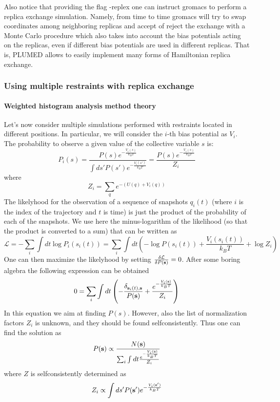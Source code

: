 Also notice that providing the flag {\ttfamily -\/replex} one can instruct gromacs to perform a replica exchange simulation. Namely, from time to time gromacs will try to swap coordinates among neighboring replicas and accept of reject the exchange with a Monte Carlo procedure which also takes into account the bias potentials acting on the replicas, even if different bias potentials are used in different replicas. That is, P\+L\+U\+M\+E\+D allows to easily implement many forms of Hamiltonian replica exchange.\hypertarget{munster_munster-multi-wham}{}\subsubsection{Using multiple restraints with replica exchange}\label{munster_munster-multi-wham}
 \hypertarget{munster_munster-wham-theory}{}\paragraph{Weighted histogram analysis method theory}\label{munster_munster-wham-theory}
Let's now consider multiple simulations performed with restraints located in different positions. In particular, we will consider the $i$-\/th bias potential as $V_i$. The probability to observe a given value of the collective variable $s$ is\+: \[ P_i({s})=\frac{P({s})e^{-\frac{V_i({s})}{k_BT}}}{\int ds' P({s}') e^{-\frac{V_i({s}')}{k_BT}}}= \frac{P({s})e^{-\frac{V_i({s})}{k_BT}}}{Z_i} \] where \[ Z_i=\sum_{q}e^{-\left(U(q)+V_i(q)\right)} \] The likelyhood for the observation of a sequence of snapshots $q_i(t)$ (where $i$ is the index of the trajectory and $t$ is time) is just the product of the probability of each of the snapshots. We use here the minus-\/logarithm of the likelihood (so that the product is converted to a sum) that can be written as \[ \mathcal{L}=-\sum_i \int dt \log P_i({s}_i(t))= \sum_i \int dt \left( -\log P({s}_i(t)) +\frac{V_i({s}_i(t))}{k_BT} +\log Z_i \right) \] One can then maximize the likelyhood by setting $\frac{\delta \mathcal{L}}{\delta P({\bf s})}=0$. After some boring algebra the following expression can be obtained \[ 0=\sum_{i}\int dt\left(-\frac{\delta_{{\bf s}_{i}(t),{\bf s}}}{P({\bf s})}+\frac{e^{-\frac{V_{i}({\bf s})}{k_{B}T}}}{Z_{i}}\right) \] In this equation we aim at finding $P(s)$. However, also the list of normalization factors $Z_i$ is unknown, and they should be found selfconsistently. Thus one can find the solution as \[ P({\bf s})\propto \frac{N({\bf s})}{\sum_i\int dt\frac{e^{-\frac{V_{i}({\bf s})}{k_{B}T}}}{Z_{i}} } \] where $Z$ is selfconsistently determined as \[ Z_i\propto\int ds' P({\bf s}') e^{-\frac{V_i({\bf s}')}{k_BT}} \]


